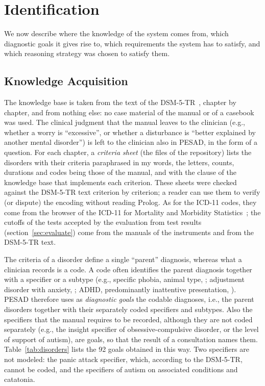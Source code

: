 \section{Identification}
\label{sec:identification}

We now describe where the knowledge of the system comes from, which
diagnostic goals it gives rise to, which requirements the system has to
satisfy, and which reasoning strategy was chosen to satisfy them.


\subsection{Knowledge Acquisition}

The knowledge base is taken from the text of the DSM-5-TR~\cite{dsm}, chapter
by chapter, and from nothing else: no case material of the manual or of a
casebook was used. The clinical judgment that the manual leaves to the
clinician (e.g., whether a worry is ``excessive'', or whether a disturbance is
``better explained by another mental disorder'') is left to the clinician also
in PESAD, in the form of a question. For each chapter, a \emph{criteria sheet}
(the files  of the repository) lists the
disorders with their criteria paraphrased in my words, the letters, counts,
durations and codes being those of the manual, and with the clause of the
knowledge base that implements each criterion. These sheets were checked against
the DSM-5-TR text criterion by criterion; a reader can use them to verify (or
dispute) the encoding without reading Prolog. As for the ICD-11
codes, they come from the browser of the ICD-11 for Mortality and Morbidity
Statistics~\cite{icd11}; the cutoffs of the tests accepted by the evaluation
from test results (section~\ref{sec:evaluate}) come from the manuals of the
instruments and from the DSM-5-TR text.

The criteria of a disorder define a single ``parent'' diagnosis, whereas what a
clinician records is a code. A code often identifies the parent diagnosis
together with a specifier or a subtype (e.g., specific phobia, animal type,
; adjustment disorder with anxiety, ; ADHD,
predominantly inattentive presentation, ). PESAD therefore uses as
\emph{diagnostic goals} the codable diagnoses, i.e., the parent disorders
together with their separately coded specifiers and subtypes. Also the
specifiers that the manual requires to be recorded, although they are not coded
separately (e.g., the insight specifier of obsessive-compulsive disorder, or the
level of support of autism), are goals, so that the result of a consultation
names them.
Table~\ref{tab:disorders} lists the 92 goals obtained in this way. Two
specifiers are not modeled: the panic attack specifier, which, according to the DSM-5-TR,
cannot be coded, and the specifiers of autism on associated conditions and
catatonia.


